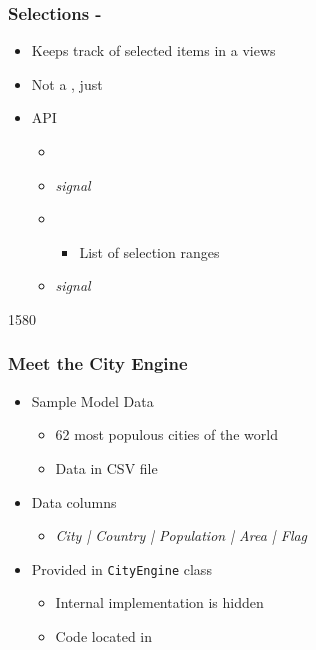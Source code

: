 \begin{slide}{}
\frametitle{Selections - }
\begin{itemize}
  \item Keeps track of selected items in a views
  \item Not a , just 
  \item {} API
  \begin{itemize}
    \item {}
    \item \textit{signal} 
    \item {} 
      \begin{itemize}
        \item List of selection ranges
      \end{itemize}
      \item \textit{signal} 
  \end{itemize}
\end{itemize}
\end{slide}


\begin{slide}{1580}
\frametitle{Meet the City Engine}
  \begin{itemize}
  \item Sample Model Data
    \begin{itemize}
    \item 62 most populous cities of the world
    \item Data in CSV file
   \end{itemize}
 \item Data columns
    \begin{itemize}
    \item \textit{City | Country | Population | Area | Flag}
   \end{itemize}
 \medskip
 \item Provided in \texttt{CityEngine} class
   \begin{itemize}
   \item Internal implementation is hidden
   \item Code located in \href{run:modelview/cityengine}{}
   \end{itemize}
 \end{itemize}
\end{slide}

